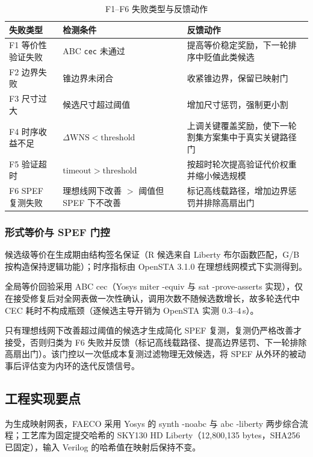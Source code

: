 \documentclass[journal]{IEEEtran}
\begin{document}
\begin{table}[!t]
\centering
\caption{F1--F6 失败类型与反馈动作}
\label{tab:failures}
\scriptsize
\setlength{\tabcolsep}{2pt}
\begin{tabular}{p{2.0cm}p{3.2cm}p{2.9cm}}
\toprule
\textbf{失败类型} & \textbf{检测条件} & \textbf{反馈动作} \\
\midrule
F1 等价性验证失败 & ABC \texttt{cec} 未通过 & 提高等价稳定奖励，下一轮排序中贬值此类候选 \\
F2 边界失败 & 锥边界未闭合 & 收紧锥边界，保留已映射门 \\
F3 尺寸过大 & 候选尺寸超过阈值 & 增加尺寸惩罚，强制更小割 \\
F4 时序收益不足 & $\Delta\mathrm{WNS} < \mathrm{threshold}$ & 上调关键覆盖奖励，使下一轮割集方案集中于真实关键路径门 \\
F5 验证超时 & $\mathrm{timeout} > \mathrm{threshold}$ & 按超时轮次提高验证代价权重并缩小候选规模 \\
F6 SPEF 复测失败 & 理想线网下改善 $>$ 阈值但 SPEF 下不改善 & 标记高线载路径，增加边界惩罚并排除高扇出门 \\
\bottomrule
\end{tabular}
\end{table}

\subsubsection{形式等价与 SPEF 门控}
候选级等价在生成期由结构签名保证（R 候选来自 Liberty 布尔函数匹配，G/B 按构造保持逻辑功能）；时序指标由 OpenSTA 3.1.0 在理想线网模式下实测得到。

全局等价回验采用 ABC cec（Yosys miter -equiv 与 sat -prove-asserts 实现），仅在接受修复后对全网表做一次性确认，调用次数不随候选数增长，故多轮迭代中 CEC 耗时不构成瓶颈（逐候选主导开销为 OpenSTA 实测 $0.3$--$4\,$s）。

只有理想线网下改善超过阈值的候选才生成简化 SPEF 复测，复测仍严格改善才接受，否则归类为 F6 失败并反馈（标记高线载路径、提高边界惩罚、下一轮排除高扇出门）。该门控以一次低成本复测过滤物理无效候选，将 SPEF 从外环的被动事后评估变为内环的迭代反馈信号。

\subsection{工程实现要点}\label{sec:impl}

为生成映射网表，FAECO 采用 Yosys 的 synth -noabc 与 abc -liberty 两步综合流程；工艺库为固定提交哈希的 SKY130 HD Liberty（12,800,135 bytes，SHA256 已固定），输入 Verilog 的哈希值在映射后保持不变。
\end{document}
